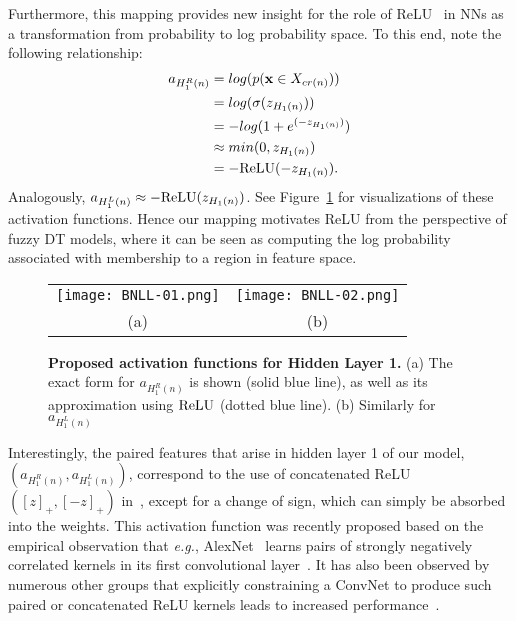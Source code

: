 \documentclass[twocolumn]{svjour3}
\begin{document}
Furthermore, this mapping provides new insight for the role of ReLU~\cite{Nair:2010vq, Glorot:2011tm} in NNs as a transformation from probability to log probability space. To this end, note the following relationship: 
\begin{equation}
\begin{split}
	a_{H^R_1(n)} 
	& = log(p(\mathbf{x} \in X_{cr(n)})) \\
	& = log(\sigma(z_{H_1(n)})) \\
	& = - log(1+e^{(-z_{H_1(n)})}) \\
	& \approx min(0,z_{H_1(n)}) \\ 
	& = -\textnormal{ReLU}(-z_{H_1(n)}).
\end{split}
\end{equation}
Analogously, \mbox{$a_{H^L_1(n)} \approx -\textnormal{ReLU}(z_{H_1(n)})$}.
See Figure~\ref{fig:ReLU} for visualizations of these activation functions.
Hence our mapping motivates ReLU from the perspective of fuzzy DT models, where it can be seen as computing the log probability associated with membership to a region in feature space.


\begin{figure}[htp!]
\begin{center}
\begin{tabular}{cc}

   \texttt{[image: BNLL-01.png]} &
   \texttt{[image: BNLL-02.png]} \\
				   (a) & (b)
\end{tabular}
\end{center}
   \caption{\textbf{Proposed activation functions for Hidden Layer 1.} (a) The exact form for $a_{H^R_1(n)}$ is shown (solid blue line), as well as its approximation using $\textnormal{ReLU}$ (dotted blue line).  (b) Similarly for $a_{H^L_1(n)}$}
\label{fig:ReLU}
\end{figure}	


Interestingly, the paired features that arise in hidden layer 1 of our model, $(a_{H^R_1(n)},a_{H^L_1(n)})$, correspond to the use of concatenated ReLU $([z]_{+},\allowbreak[-z]_{+})$ in~\cite{Shang:2016tj}, except for a change of sign, which can simply be absorbed into the weights.
This activation function was recently proposed based on the empirical observation that \textit{e.g.}, AlexNet~\cite{krizhevsky_cnn_2012} learns pairs of strongly negatively correlated kernels in its first convolutional layer~\cite{Shang:2016tj}.  It has also been observed by numerous other groups that explicitly constraining a ConvNet to produce such paired or concatenated ReLU kernels leads to increased performance~\cite{Blot:2016ie, Coates:2011ud,Kim:2015us}.
\end{document}
